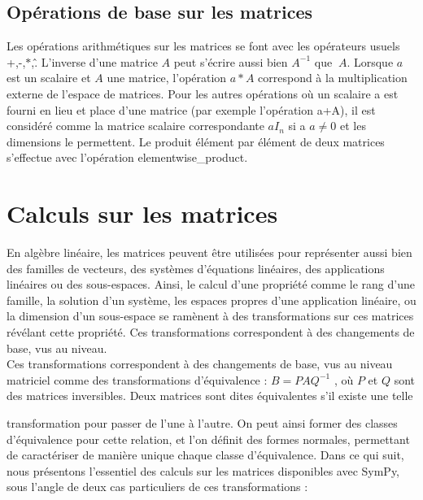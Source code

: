 \subsection{ Opérations de base sur les matrices}
Les opérations arithmétiques sur les matrices se font avec les opérateurs usuels +,-,$\ast$,\^. L’inverse 
d’une matrice $A$ peut s’écrire aussi bien $A^{-1}$ que $~A$. Lorsque $a$ est un scalaire et $A$ une matrice, 
l’opération $a*A$ correspond à la multiplication externe de l’espace de matrices. Pour les autres opérations où 
un scalaire a est fourni en lieu et place d’une matrice (par exemple l’opération a+A), il est considéré comme la 
matrice scalaire correspondante $aI_{n}$ si a $a\neq 0$ et les dimensions le permettent. Le produit élément par 
élément de deux matrices s’effectue avec l’opération elementwise\_product.
\section{ Calculs sur les matrices}
En algèbre linéaire, les matrices peuvent être utilisées pour représenter aussi bien des familles de vecteurs, 
des systèmes d’équations linéaires, des applications linéaires ou des sous-espaces. Ainsi, le calcul d’une 
propriété comme le rang d’une famille, la solution d’un système, les espaces propres d’une application linéaire, 
ou la dimension d’un sous-espace se ramènent à des transformations sur ces matrices révélant cette propriété. 
Ces transformations correspondent à des changements de base, vus au niveau.
\\
Ces transformations correspondent à des changements de base, vus au niveau
matriciel comme des transformations d’équivalence : $B = PAQ^{-1}$ , où $P$ et $Q$ sont
des matrices inversibles. Deux matrices sont dites équivalentes s’il existe une telle

transformation pour passer de l’une à l’autre. On peut ainsi former des classes
d’équivalence pour cette relation, et l’on définit des formes normales, permettant
de caractériser de manière unique chaque classe d’équivalence. Dans ce qui suit,
nous présentons l’essentiel des calculs sur les matrices disponibles avec SymPy, sous
l’angle de deux cas particuliers de ces transformations :

